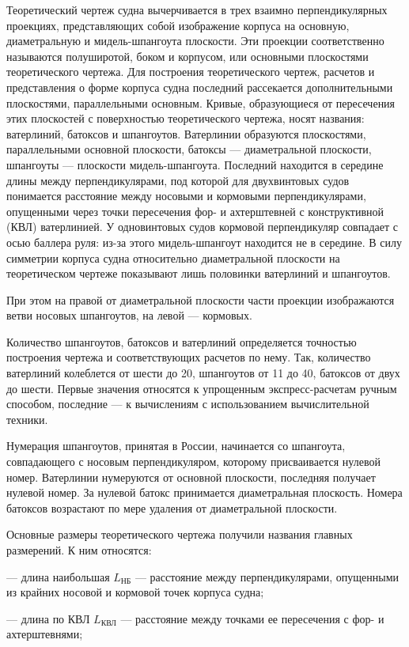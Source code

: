 Теоретический чертеж судна вычерчивается в трех взаимно перпендикулярных проекциях, представляющих собой изображение корпуса на основную, диаметральную и мидель-шпангоута плоскости.
Эти проекции соответственно называются полуширотой, боком и корпусом, или основными плоскостями теоретического чертежа.
Для построения теоретического чертеж, расчетов и представления о форме корпуса судна последний рассекается дополнительными плоскостями, параллельными основным.
Кривые, образующиеся от пересечения этих плоскостей с поверхностью теоретического чертежа, носят названия: ватерлиний, батоксов и шпангоутов.
Ватерлинии образуются плоскостями, параллельными основной плоскости, батоксы — диаметральной плоскости, шпангоуты — плоскости мидель-шпангоута.
Последний находится в середине длины между перпендикулярами, под которой для двухвинтовых судов понимается расстояние между носовыми и кормовыми перпендикулярами, опущенными через точки пересечения фор- и ахтерштевней с конструктивной (КВЛ) ватерлинией.
У одновинтовых судов кормовой перпендикуляр совпадает с осью баллера руля: из-за этого мидель-шпангоут находится не в середине.
В силу симметрии корпуса судна относительно диаметральной плоскости на теоретическом чертеже показывают лишь половинки ватерлиний и шпангоутов.

При этом на правой от диаметральной плоскости части проекции изображаются ветви носовых шпангоутов, на левой — кормовых.

Количество шпангоутов, батоксов и ватерлиний определяется точностью построения чертежа и соответствующих расчетов по нему.
Так, количество ватерлиний колеблется от шести до 20, шпангоутов от 11 до 40, батоксов от двух до шести.
Первые значения относятся к упрощенным экспресс-расчетам ручным способом, последние — к вычислениям с использованием вычислительной техники.

Нумерация шпангоутов, принятая в России, начинается со шпангоута, совпадающего с носовым перпендикуляром, которому присваивается нулевой номер.
Ватерлинии нумеруются от основной плоскости, последняя получает нулевой номер.
За нулевой батокс принимается диаметральная плоскость.
Номера батоксов возрастают по мере удаления от диаметральной плоскости.

Основные размеры теоретического чертежа получили названия главных размерений.
К ним относятся:

--- длина наибольшая $L_{\text{НБ}}$ --- расстояние между перпендикулярами, опущенными из крайних носовой и кормовой точек корпуса судна;

--- длина по КВЛ $L_{\text{КВЛ}}$ --- расстояние между точками ее пересечения с фор- и ахтерштевнями;

